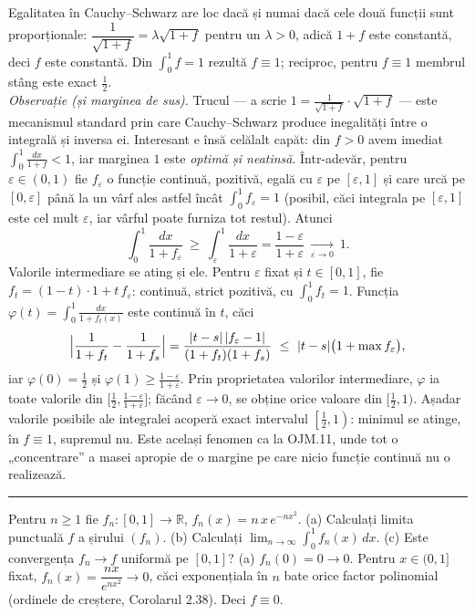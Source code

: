 Egalitatea în Cauchy--Schwarz are loc dacă și numai dacă cele două funcții sunt
proporționale: $\dfrac{1}{\sqrt{1+f}} = \lambda\sqrt{1+f}$ pentru un $\lambda>0$,
adică $1+f$ este constantă, deci $f$ este constantă. Din $\int_0^1 f = 1$ rezultă
$f\equiv 1$; reciproc, pentru $f\equiv1$ membrul stâng este exact $\frac12$.\\[2pt]
\emph{Observație (și marginea de sus).} Trucul --- a scrie
$1=\frac{1}{\sqrt{1+f}}\cdot\sqrt{1+f}$ --- este mecanismul standard prin care
Cauchy--Schwarz produce inegalități între o integrală și inversa ei. Interesant e
însă celălalt capăt: din $f>0$ avem imediat
$\int_0^1\frac{dx}{1+f}<1$, iar marginea $1$ este \emph{optimă și neatinsă}. Într-adevăr,
pentru $\varepsilon\in(0,1)$ fie $f_\varepsilon$ o funcție continuă, pozitivă, egală
cu $\varepsilon$ pe $[\varepsilon,1]$ și care urcă pe $[0,\varepsilon]$ până la un vârf
ales astfel încât $\int_0^1 f_\varepsilon=1$ (posibil, căci integrala pe
$[\varepsilon,1]$ este cel mult $\varepsilon$, iar vârful poate
furniza tot restul). Atunci
\[ \int_0^1\frac{dx}{1+f_\varepsilon}\ \ge\ \int_\varepsilon^1\frac{dx}{1+\varepsilon}
   =\frac{1-\varepsilon}{1+\varepsilon}\ \xrightarrow[\varepsilon\to0]{}\ 1 . \]
Valorile intermediare se ating și ele. Pentru $\varepsilon$ fixat și $t\in[0,1]$, fie
$f_t=(1-t)\cdot1+t\,f_\varepsilon$: continuă, strict pozitivă, cu $\int_0^1 f_t=1$. Funcția
$\varphi(t)=\int_0^1\frac{dx}{1+f_t(x)}$ este continuă în $t$, căci
\[ \Bigl|\frac{1}{1+f_t}-\frac{1}{1+f_s}\Bigr|=\frac{|t-s|\,|f_\varepsilon-1|}{(1+f_t)(1+f_s)}\ \le\ |t-s|\bigl(1+\max f_\varepsilon\bigr), \]
iar $\varphi(0)=\frac12$ și $\varphi(1)\ge\frac{1-\varepsilon}{1+\varepsilon}$. Prin proprietatea
valorilor intermediare, $\varphi$ ia toate valorile din
$\bigl[\frac12,\frac{1-\varepsilon}{1+\varepsilon}\bigr]$; făcând $\varepsilon\to0$, se obține orice valoare din $\bigl[\frac12,1\bigr)$.
Așadar valorile posibile ale integralei acoperă exact intervalul
$\left[\frac12,1\right)$: minimul se atinge, în $f\equiv1$, supremul nu. Este același
fenomen ca la OJM.11, unde tot o „concentrare'' a masei apropie de o margine pe care
nicio funcție continuă nu o realizează.
\vspace{1mm}\hrule

Pentru $n\ge1$ fie $f_n:[0,1]\to\mathbb{R}$, $f_n(x)=n\,x\,e^{-nx^2}$.
(a) Calculați limita punctuală $f$ a șirului $(f_n)$.
(b) Calculați $\displaystyle\lim_{n\to\infty}\int_0^1f_n(x)\,dx$.
(c) Este convergența $f_n\to f$ uniformă pe $[0,1]$?
\sol (a) $f_n(0)=0\to0$. Pentru $x\in(0,1]$ fixat, $f_n(x)=\dfrac{nx}{e^{nx^2}}\to0$, căci exponențiala în $n$ bate orice factor polinomial (ordinele de creștere, Corolarul 2.38). Deci $f\equiv0$.

